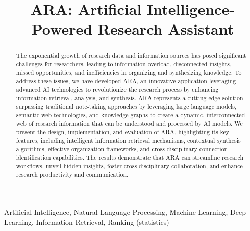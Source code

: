 \documentclass[a4paper,conference]{IEEEtran}
\begin{document}
\title{ARA: Artificial Intelligence-Powered Research Assistant}

\author{
}

\maketitle

\begin{abstract}
The exponential growth of research data and information sources has posed significant challenges for researchers, leading to information overload, disconnected insights, missed opportunities, and inefficiencies in organizing and synthesizing knowledge. To address these issues, we have developed ARA, an innovative application leveraging advanced AI technologies to revolutionize the research process by enhancing information retrieval, analysis, and synthesis. ARA represents a cutting-edge solution surpassing traditional note-taking approaches by leveraging large language models, semantic web technologies, and knowledge graphs to create a dynamic, interconnected web of research information that can be understood and processed by AI models. We present the design, implementation, and evaluation of ARA, highlighting its key features, including intelligent information retrieval mechanisms, contextual synthesis algorithms, effective organization frameworks, and cross-disciplinary connection identification capabilities. The results demonstrate that ARA can streamline research workflows, unveil hidden insights, foster cross-disciplinary collaboration, and enhance research productivity and communication.
\end{abstract}

\begin{IEEEkeywords}
Artificial Intelligence, Natural Language Processing,  Machine Learning, Deep Learning, Information Retrieval, Ranking (statistics)
\end{IEEEkeywords}
\end{document}
